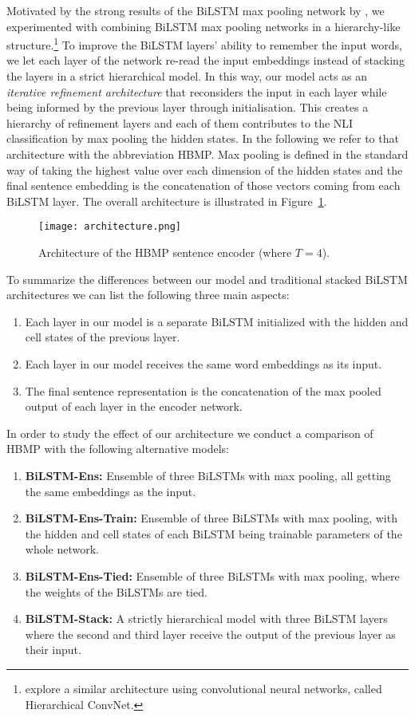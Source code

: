 \documentclass{nle}
\begin{document}
Motivated by the strong results of the BiLSTM max pooling network by \cite{infersent}, we experimented with combining BiLSTM max pooling networks in a hierarchy-like structure.\footnote{\cite{infersent} explore a similar architecture using convolutional neural networks, called Hierarchical ConvNet.} To improve the BiLSTM layers' ability to remember the input words, we let each layer of the network re-read the input embeddings instead of stacking the layers in a strict hierarchical model. In this way, our model acts as an {\em iterative refinement architecture} that reconsiders the input in each layer while being informed by the previous layer through initialisation.
This creates a hierarchy of refinement layers and each of them contributes to the NLI classification by max pooling the hidden states. In the following we refer to that architecture with the abbreviation HBMP. Max pooling is defined in the standard way of taking the highest value over each dimension of the hidden states and the final sentence embedding is the concatenation of those vectors coming from each BiLSTM layer. The overall architecture is illustrated in Figure~\ref{fig:architecture}.


\begin{figure}[t]
  \texttt{[image: architecture.png]}
  \caption{Architecture of the HBMP sentence encoder (where $T=4$).}
  \label{fig:architecture}
\end{figure}

To summarize the differences between our model and traditional stacked BiLSTM architectures we can list the following three main aspects:
\begin{enumerate}
    \item Each layer in our model is a separate BiLSTM initialized with the hidden and cell states of the previous layer.
    \item Each layer in our model receives the same word embeddings as its input.
    \item The final sentence representation is the concatenation of the max pooled output of each layer in the encoder network.
\end{enumerate}

In order to study the effect of our architecture we conduct a comparison of HBMP with the following alternative models:
\begin{enumerate}
    \item \textbf{BiLSTM-Ens:} Ensemble of three BiLSTMs with max pooling, all getting the same embeddings as the input.
    \item \textbf{BiLSTM-Ens-Train:} Ensemble of three BiLSTMs with max pooling, with the hidden and cell states of each BiLSTM being trainable parameters of the whole network.
    \item \textbf{BiLSTM-Ens-Tied:} Ensemble of three BiLSTMs with max pooling, where the weights of the BiLSTMs are tied.
    \item \textbf{BiLSTM-Stack:} A strictly hierarchical model with three BiLSTM layers where the second and third layer receive the output of the previous layer as their input.
\end{enumerate}
\end{document}
